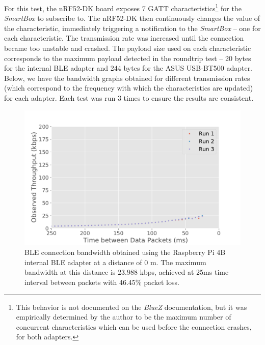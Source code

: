 For this test, the nRF52-DK board exposes 7 \acs{GATT} characteristics\footnote{This behavior is not documented on the \textit{BlueZ} documentation, but it was empirically determined by the author to be the maximum number of concurrent characteristics which can be used before the connection crashes, for both adapters.} for the \textit{SmartBox} to subscribe to. The nRF52-DK then continuously changes the value of the characteristic, immediately triggering a notification to the \textit{SmartBox} -- one for each characteristic. The transmission rate was increased until the connection became too unstable and crashed. The payload size used on each characteristic corresponds to the maximum payload detected in the roundtrip test -- 20 bytes for the internal \acs{BLE} adapter and 244 bytes for the ASUS USB-BT500 adapter.
Below, we have the bandwidth graphs obtained for different transmission rates (which correspond to the frequency with which the characteristics are updated) for each adapter. Each test was run 3 times to ensure the results are consistent.


\begin{figure}[H]
    \centering
    \includegraphics[width=0.75\linewidth]{images/ble-bandwidth-hci1-0cm.pdf}
    \caption[\acs{BLE} connection bandwidth obtained using the ASUS USB-BT500 adapter at a distance of 0 m.]
    {\acs{BLE} connection bandwidth obtained using the Raspberry Pi 4B internal \acs{BLE} adapter at a distance of $0\text{ m}$. The maximum bandwidth at this distance is $23.988$ kbps, achieved at 25ms time interval between packets with 46.45\% packet loss.}
    \label{fig:ble-bandwidth-hci1-0m}
\end{figure}

